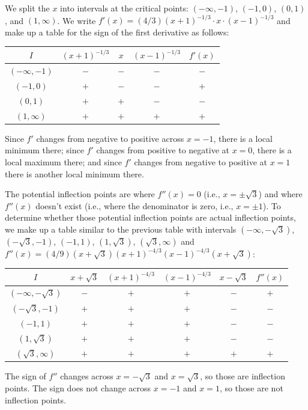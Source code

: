 \documentclass{article}
\begin{document}
\begin{enumerate}
\begin{enumerate}
    We split the $x$ into intervals at the critical points: $(-\infty,-1)$,
    $(-1,0)$, $(0,1)$, and $(1,\infty)$.
    We write $f'(x)=(4/3) (x+1)^{-1/3} \cdot x \cdot (x-1)^{-1/3}$
    and make up a table for the sign of the first derivative as follows:
    \begin{center}
      \begin{tabular}{|c|c|c|c|c|}
      \hline
      $I$            & $(x+1)^{-1/3}$ & $x$ & $(x-1)^{-1/3}$ & $f'(x)$
      \\
      \hline
      $(-\infty,-1)$ & $-$            & $-$ & $-$            & $-$
      \\
      $(-1,0)$       & $+$            & $-$ & $-$            & $+$
      \\
      $(0,1)$        & $+$            & $+$ & $-$            & $-$
      \\
      $(1,\infty)$   & $+$            & $+$ & $+$            & $+$
      \\
      \hline
      \end{tabular}
    \end{center}
    Since $f'$ changes from negative to positive across $x=-1$, there is
    a local minimum there; since $f'$ changes from positive to negative at
    $x=0$, there is a local maximum there; and since $f'$ changes from 
    negative to positive at $x=1$ there is another local minimum there.

    The potential inflection points are where $f''(x)=0$ (i.e., $x=\pm\sqrt{3}$)
    and where $f''(x)$ doesn't exist (i.e., where the denominator is zero,
    i.e., $x=\pm 1$).  To determine whether those potential inflection 
    points are actual inflection points, we make up a table similar to
    the previous table with intervals $(-\infty,-\sqrt{3})$,
    $(-\sqrt{3},-1)$, $(-1,1)$, $(1,\sqrt{3})$, $(\sqrt{3},\infty)$
    and $f''(x)=(4/9)(x+\sqrt{3})(x+1)^{-4/3}(x-1)^{-4/3}(x+\sqrt{3})$:
    \begin{center}
      \begin{tabular}{|c|c|c|c|c|c|}
\hline
$I$ & $x+\sqrt{3}$ & $(x+1)^{-4/3}$ & $(x-1)^{-4/3}$ & $x-\sqrt{3}$ & $f''(x)$
\\
\hline
$(-\infty,-\sqrt{3})$ & $-$ & $+$   & $+$            & $-$          & $+$
\\
$(-\sqrt{3},-1)$      & $+$ & $+$   & $+$            & $-$          & $-$
\\
$(-1,1)$              & $+$ & $+$   & $+$            & $-$          & $-$
\\
$(1,\sqrt{3})$        & $+$ & $+$   & $+$            & $-$          & $-$
\\
$(\sqrt{3},\infty)$   & $+$ & $+$   & $+$            & $+$          & $+$
\\
\hline
      \end{tabular}
    \end{center}
    The sign of $f''$ changes across $x=-\sqrt{3}$ and $x=\sqrt{3}$, so those
    are inflection points.  The sign does not change across $x=-1$ and $x=1$,
    so those are not inflection points.


\end{enumerate}
\end{enumerate}
\end{document}
